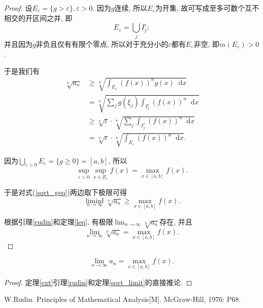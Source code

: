 \documentclass[a4paper,12pt]{ctexart}
\newcommand{\diff}{\mathop{}\!\mathrm{d}}
\newcommand{\maxf}{\max_{x\in[a,b]}{f(x)}}
\newcommand{\E}{E_{\varepsilon}}
\begin{document}
    \begin{proof}
        设$\E =\{g>\varepsilon\}, \varepsilon>0$. 因为$g$连续, 所以$\E$为开集,
        故可写成至多可数个互不相交的开区间之并, 即
        \begin{equation}
            \E = \bigcup_j{I_j^{\varepsilon}};
        \end{equation}
        并且因为$g$非负且仅有有限个零点,
        所以对于充分小的$\varepsilon$都有$\E$非空, 即$m(\E)>0$.

        于是我们有
        \begin{equation}
        \label{sqrt_geq}
        \begin{aligned}
            \sqrt[n]{a_n}
            &\geq \sqrt[n]{\int_{\E}{(f(x))^{n}g(x)\diff x}}\\
            &= \sqrt[n]{\sum_{j}
                {g(\xi_j)\int_{I_j^{\varepsilon}}{(f(x))^n\diff x}}}\\
            &\geq \sqrt[n]{\varepsilon}\cdot
                \sqrt[n]{\sum_{j}{\int_{I_j^{\varepsilon}}{(f(x))^n\diff x}}}\\
            &= \sqrt[n]{\varepsilon}\cdot\sqrt[n]{\int_{\E}{(f(x))^n \diff x}}.
        \end{aligned}
        \end{equation}

        因为$\displaystyle \bigcup_{\varepsilon >0}{\E} = \{g\geq 0\}=[a,b]$,
        所以
        \begin{equation}
            \sup_{\varepsilon >0}\sup_{x\in \E}{f(x)} = \maxf.
        \end{equation}

        于是对式(\ref{sqrt_geq})两边取下极限可得
        \begin{equation}
            \liminf_{n\to\infty}{\sqrt[n]{a_n}} \geq \maxf.
        \end{equation}

        根据引理\ref{rudin}和定理\ref{leq},
        有极限$\lim_{n\to\infty}\sqrt[n]{a_n}$存在, 并且
        \begin{equation}
            \lim_{n\to\infty}\sqrt[n]{a_n}=\maxf.
        \end{equation}
    \end{proof}

    \begin{corollary}
        \begin{equation}
            \lim_{n\to\infty}{a_n} = \maxf.
        \end{equation}
    \end{corollary}

    \begin{proof}
        定理\ref{ext}引理\ref{rudin}和定理\ref{sqrt_limit}的直接推论.
    \end{proof}

    \begin{thebibliography}{9}
            W.Rudin. Principles of Mathematical Analysis[M].
            McGraw-Hill, 1976: P68.
    \end{thebibliography}
\end{document}
